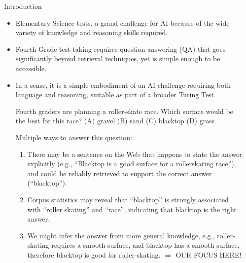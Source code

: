 \documentclass[final]{beamer}
\newlength{\sepwid}
\newlength{\onecolwid}
\begin{document}
\begin{frame}[t] %

\begin{columns}[t] %

\begin{column}{\sepwid}\end{column} %

\begin{column}{\onecolwid} %

\begin{block}{Introduction}


\begin{itemize}
	\item Elementary Science tests, a grand challenge for AI because of the wide variety	of knowledge and reasoning skills required. 
	\item Fourth Grade test-taking requires question answering (QA) that goes significantly beyond retrieval techniques, yet is simple enough to be accessible.
	\item In a sense, it is a simple embodiment of an AI challenge
	requiring both language and reasoning, suitable as part
	of a broader Turing Test
	\vspace{-0.5cm}
	\begin{alertblock}{}
		\footnotesize
		Fourth graders are planning a roller-skate race. Which
		surface would be the best for this race? (A) gravel (B) sand (C) blacktop (D) grass
	\end{alertblock} 
	\vspace{-1cm}
	Multiple ways to answer this question: 
	\begin{enumerate}
		\item There may be a sentence on the Web that happens to state the answer
		explicitly (e.g., ``Blacktop is a good surface for a rollerskating
		race''), and could be reliably retrieved to support the
		correct answer (``blacktop''). 
		\item Corpus statistics may reveal that ``blacktop'' is strongly associated with ``roller skating'' and ``race'', indicating that blacktop is the right answer.
		\item We might infer the answer from more general knowledge, e.g., roller-skating requires a smooth surface, and blacktop has a smooth surface, therefore blacktop is good for roller-skating. { \color{blue}$\Rightarrow $ OUR FOCUS HERE! }
	\end{enumerate}
	\end{itemize}
\end{block}


\end{column}
\end{columns}
\end{frame}
\end{document}
